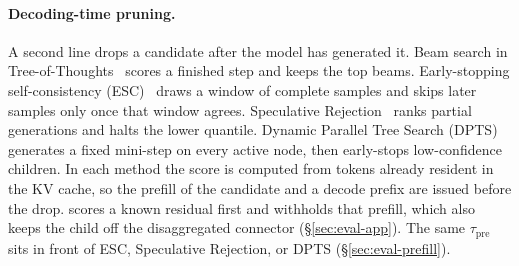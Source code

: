 \paragraph{Decoding-time pruning.}
A second line drops a candidate after the model has generated it.
Beam search in Tree-of-Thoughts~\cite{tot} scores a finished step and keeps the top beams.
Early-stopping self-consistency (ESC)~\cite{esc} draws a window of complete samples and skips later samples only once that window agrees.
Speculative Rejection~\cite{specrej} ranks partial generations and halts the lower quantile.
Dynamic Parallel Tree Search (DPTS)~\cite{dpts} generates a fixed mini-step on every active node, then early-stops low-confidence children.
In each method the score is computed from tokens already resident in the KV cache, so the prefill of the candidate and a decode prefix are issued before the drop.
\app scores a known residual first and withholds that prefill, which also keeps the child off the disaggregated connector (\S\ref{sec:eval-app}).
The same $\tau_{\mathrm{pre}}$ sits in front of ESC, Speculative Rejection, or DPTS (\S\ref{sec:eval-prefill}).
